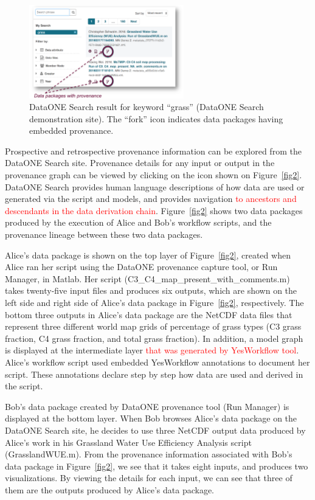 \documentclass[a4paper]{llncs}
\begin{document}
\begin{figure}[t]
\centering   
\includegraphics[width=0.6\textwidth]{figs/ab-crop}
\caption{DataONE Search result for keyword  ``grass'' (DataONE Search demonstration site). The ``fork'' icon indicates data packages having embedded provenance.}
\label{fig1}
\end{figure}

Prospective and retrospective provenance information can be explored from the DataONE Search site. Provenance details for any input or output in the provenance graph can be viewed by clicking on the icon shown on Figure~\ref{fig2}. DataONE Search provides human language descriptions of how data are used or generated via the script and models, and provides navigation \textcolor{red}{to ancestors and descendants in the data derivation chain}. Figure~\ref{fig2} shows two data packages produced by the execution of Alice and Bob's workflow scripts, and the provenance lineage between these two data packages. 

Alice's data package \cite{yaxing} is shown on the top layer of Figure~\ref{fig2}, created when Alice ran her script using the DataONE provenance capture tool, or Run Manager, in Matlab. Her script (C3\_C4\_map\_present\_with\_comments.m) takes twenty-five input files and produces six outputs, which are shown on the left side and right side of Alice's data package in Figure~\ref{fig2}, respectively. The bottom three outputs in Alice's data package are the NetCDF data files that represent three different world map grids of percentage of grass types (C3 grass fraction, C4 grass fraction, and total grass fraction). In addition, a model graph is displayed at the intermediate layer \textcolor{red}{that was generated by YesWorkflow tool}\cite{yesworkflow}. Alice's workflow script used embedded YesWorkflow annotations to document her script. These annotations declare step by step how data are used and derived in the script. 


Bob's data package \cite{christopher} created by DataONE provenance tool (Run Manager) is displayed at the bottom layer. When Bob browses Alice's data package on the DataONE Search site, he decides to use three NetCDF output data produced by Alice's work in his Grassland Water Use Efficiency Analysis script (GrasslandWUE.m). From the provenance information associated with Bob's data package in Figure~\ref{fig2}, we see that it takes eight inputs, and produces two visualizations. By viewing the details for each input, we can see that three of them are the outputs produced by Alice's data package.  
\end{document}
